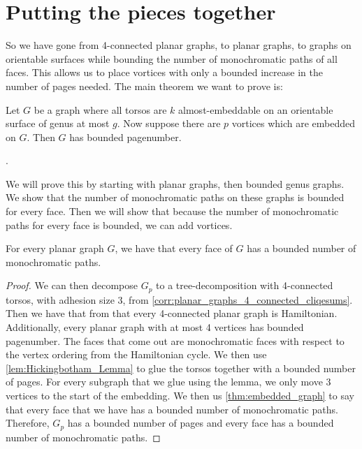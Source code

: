 \section{Putting the pieces together}
So we have gone from 4-connected planar graphs, to planar graphs, to graphs on orientable surfaces while bounding the number of monochromatic paths of all faces. This allows us to place vortices with only a bounded increase in the number of pages needed.
The main theorem we want to prove is:
\begin{theorem}\label{thm:orientablevortices}
	Let $G$ be a graph where all torsos are $k$ almost-embeddable on an orientable surface of genus at most $g$.  Now suppose there are $p$ vortices which are embedded on $G$. Then $G$ has bounded pagenumber.
\end{theorem}
.

We will prove this by starting with planar graphs, then bounded genus graphs. We show that the number of monochromatic paths on these graphs is bounded for every face. Then we will show that because the number of monochromatic paths for every face is bounded, we can add vortices.

\begin{lemma}\label{lem:planargraphs_monochromatic_paths}
	For every planar graph $G$, we have that every face of $G$ has a bounded number of monochromatic paths.
\end{lemma}
\begin{proof}
	We can then decompose $G_p$ to a tree-decomposition with 4-connected torsos, with adhesion size 3, from \cref{corr:planar_graphs_4_connected_cliqesums}. Then we have that from \textcite{tutteTheoremPlanarGraphs1956} that every 4-connected planar graph is Hamiltonian. Additionally, every planar graph with at most 4 vertices has bounded pagenumber.
	The faces that come out are monochromatic faces with respect to the vertex ordering from the Hamiltonian cycle.
	We then use \cref{lem:Hickingbotham_Lemma} to glue the torsos together with a bounded number of pages. For every subgraph that we glue using the lemma, we only move 3 vertices to the start of the embedding. We then us \cref{thm:embedded_graph} to say that every face that we have has a bounded number of monochromatic paths.
	Therefore, $G_p$ has a bounded number of pages and every face has a bounded number of monochromatic paths.
\end{proof}


